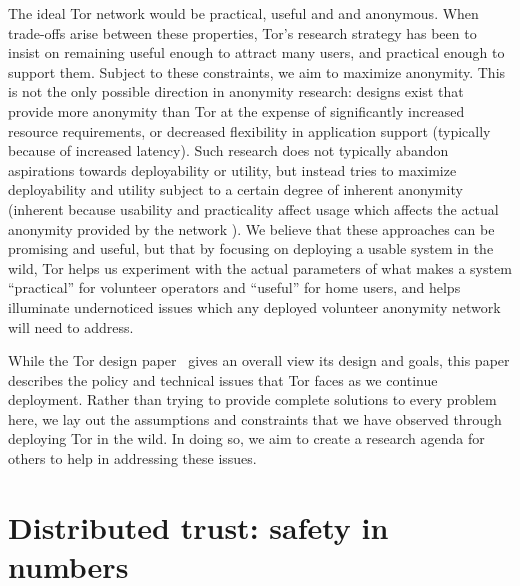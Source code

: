 \documentclass{llncs}
\begin{document}
The ideal Tor network would be practical, useful and and anonymous. When
trade-offs arise between these properties, Tor's research strategy has been
to insist on remaining useful enough to attract many users,
and practical enough to support them.  Subject to these
constraints, we aim to maximize anonymity.  This is not the only possible
direction in anonymity research: designs exist that provide more anonymity
than Tor at the expense of significantly increased resource requirements, or
decreased flexibility in application support (typically because of increased
latency).  Such research does not typically abandon aspirations towards
deployability or utility, but instead tries to maximize deployability and
utility subject to a certain degree of inherent anonymity (inherent because
usability and practicality affect usage which affects the actual anonymity
provided by the network \cite{back01,econymics}). We believe that these
approaches can be promising and useful, but that by focusing on deploying a
usable system in the wild, Tor helps us experiment with the actual parameters
of what makes a system ``practical'' for volunteer operators and ``useful''
for home users, and helps illuminate undernoticed issues which any deployed
volunteer anonymity network will need to address. 

While the Tor design paper~\cite{tor-design} gives an overall view its
design and goals,
this paper describes the policy and technical issues that Tor faces as
we continue deployment. Rather than trying to provide complete solutions
to every problem here, we lay out the assumptions and constraints
that we have observed through deploying Tor in the wild. In doing so, we
aim to create a research agenda for others to
help in addressing these issues.

\section{Distributed trust: safety in numbers}
\label{sec:what-is-tor}
\end{document}
